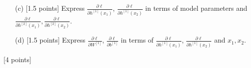 \documentclass{article}
\newif\ifsolutions
\newenvironment{labelledanswer}{{\bf Answer:} \sf }{}%
\newcommand{\answer}[2]
{{
\ifsolutions
\begin{labelledanswer}
\color{red} 
#2
\end{labelledanswer}
\else
#1
\fi
}}
\begin{document}
\begin{itemize}
{    }
    
    \item [(c)] [1.5 points] Express $\frac{\partial \ell}{\partial h^{[1]}(x_1)}$, $\frac{\partial \ell}{\partial h^{[1]}(x_2)}$ in terms of model parameters and $\frac{\partial \ell}{\partial h^{[2]}(x_1)}, \frac{\partial \ell}{\partial h^{[2]}(x_2)}$.
    
    \answer{}{}
    
    \item [(d)] [1.5 points] Express $\frac{\partial \ell}{\partial W^{[1]}}$, $\frac{\partial \ell}{\partial b^{[1]}}$ in terms of $\frac{\partial \ell}{\partial h^{[1]}(x_1)}$, $\frac{\partial \ell}{\partial h^{[1]}(x_2)}$ and $x_1, x_2$.
    
    \answer{}{}
    
\end{itemize}

\noindent {} [4 points]
\end{document}
